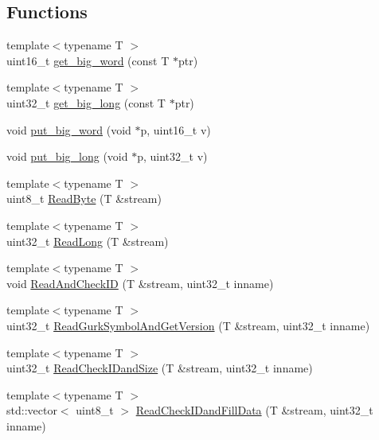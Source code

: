 \subsection*{Functions}
\begin{DoxyCompactItemize}
\item 
{\footnotesize template$<$typename T $>$ }\\uint16\-\_\-t \hyperlink{a00206_ab4a05d2a846c45cc87c220272f126e55}{get\-\_\-big\-\_\-word} (const T $\ast$ptr)
\item 
{\footnotesize template$<$typename T $>$ }\\uint32\-\_\-t \hyperlink{a00206_a76c92ca8a843f628f4341e751708e66c}{get\-\_\-big\-\_\-long} (const T $\ast$ptr)
\item 
void \hyperlink{a00206_af0352129dc73b31a1357a4cd28418270}{put\-\_\-big\-\_\-word} (void $\ast$p, uint16\-\_\-t v)
\item 
void \hyperlink{a00206_ac45abe431a034c606df9b0eafeb21606}{put\-\_\-big\-\_\-long} (void $\ast$p, uint32\-\_\-t v)
\item 
{\footnotesize template$<$typename T $>$ }\\uint8\-\_\-t \hyperlink{a00206_a92442dbb9a74e7931daae569520e322f}{Read\-Byte} (T \&stream)
\item 
{\footnotesize template$<$typename T $>$ }\\uint32\-\_\-t \hyperlink{a00206_aa064186902b19dc3156392e0a74c0310}{Read\-Long} (T \&stream)
\item 
{\footnotesize template$<$typename T $>$ }\\void \hyperlink{a00206_a1dc8c0415dbf239c99f12fb8ef695cb6}{Read\-And\-Check\-I\-D} (T \&stream, uint32\-\_\-t inname)
\item 
{\footnotesize template$<$typename T $>$ }\\uint32\-\_\-t \hyperlink{a00206_a27fae59fc25c64deef53e1ad62225662}{Read\-Gurk\-Symbol\-And\-Get\-Version} (T \&stream, uint32\-\_\-t inname)
\item 
{\footnotesize template$<$typename T $>$ }\\uint32\-\_\-t \hyperlink{a00206_a2a8e4c0932105b96ed50eebb82d10437}{Read\-Check\-I\-Dand\-Size} (T \&stream, uint32\-\_\-t inname)
\item 
{\footnotesize template$<$typename T $>$ }\\std\-::vector$<$ uint8\-\_\-t $>$ \hyperlink{a00206_aef19a6d56913b5cd2282dd07827a3cd7}{Read\-Check\-I\-Dand\-Fill\-Data} (T \&stream, uint32\-\_\-t inname)
\item 

\end{DoxyCompactItemize}
